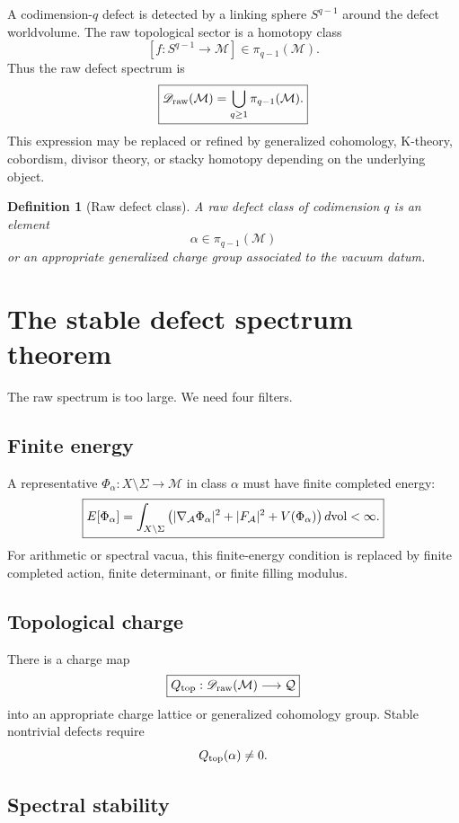 \documentclass[11pt]{article}
\newtheorem{definition}[theorem]{Definition}
\newcommand{\A}{\mathcal A}
\newcommand{\M}{\mathcal M}
\begin{document}
A codimension-$q$ defect is detected by a linking sphere $S^{q-1}$ around the defect worldvolume. The raw topological sector is a homotopy class
\[
        [f:S^{q-1}\to \M]\in \pi_{q-1}(\M).
\]
Thus the raw defect spectrum is
\[
\boxed{
        \mathscr D_{\rm raw}(\M)=\bigcup_{q\ge1}\pi_{q-1}(\M).
}
\]
This expression may be replaced or refined by generalized cohomology, K-theory, cobordism, divisor theory, or stacky homotopy depending on the underlying object.

\begin{definition}[Raw defect class]
A raw defect class of codimension $q$ is an element
\[
        \alpha\in\pi_{q-1}(\M)
\]
or an appropriate generalized charge group associated to the vacuum datum.
\end{definition}

\section{The stable defect spectrum theorem}

The raw spectrum is too large. We need four filters.

\subsection{Finite energy}

A representative $\Phi_\alpha:X\setminus\Sigma\to\M$ in class $\alpha$ must have finite completed energy:
\[
\boxed{
E[\Phi_\alpha]
=
\int_{X\setminus\Sigma}
\left(
|\nabla_{\A}\Phi_\alpha|^2+|F_{\A}|^2+V(\Phi_\alpha)
\right)d{\rm vol}<\infty.
}
\]
For arithmetic or spectral vacua, this finite-energy condition is replaced by finite completed action, finite determinant, or finite filling modulus.

\subsection{Topological charge}

There is a charge map
\[
\boxed{
Q_{\rm top}:\mathscr D_{\rm raw}(\M)\longrightarrow\mathcal Q
}
\]
into an appropriate charge lattice or generalized cohomology group. Stable nontrivial defects require
\[
        Q_{\rm top}(\alpha)\ne0.
\]

\subsection{Spectral stability}
\end{document}
